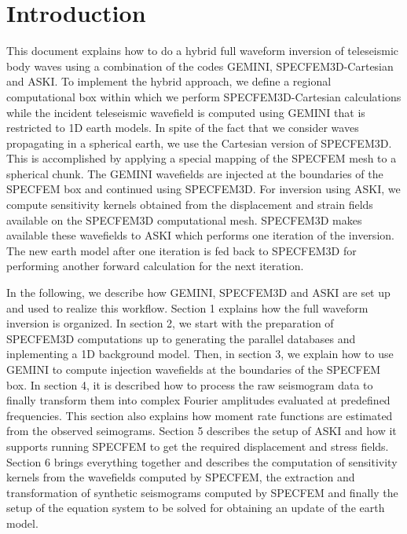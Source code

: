 %
\section*{Introduction}
%
 This document explains how to do a hybrid full waveform inversion of teleseismic body waves using a combination of the codes GEMINI, SPECFEM3D-Cartesian and ASKI. To implement the hybrid approach, we define a regional computational box within which we perform SPECFEM3D-Cartesian calculations while the incident teleseismic wavefield is computed using GEMINI that is restricted to 1D earth models. In spite of the fact that we consider waves propagating in a spherical earth, we use the Cartesian version of SPECFEM3D. This is accomplished by applying a special mapping of the SPECFEM mesh to a spherical chunk. The GEMINI wavefields are injected at the boundaries of the SPECFEM box and continued using SPECFEM3D. For inversion using ASKI, we compute sensitivity kernels obtained from the displacement and strain fields available on the SPECFEM3D computational mesh. SPECFEM3D makes available these wavefields to ASKI which performs one iteration of the inversion. The new earth model after one iteration is fed back to SPECFEM3D for performing another forward calculation for the next iteration.

 In the following, we describe how GEMINI, SPECFEM3D and ASKI are set up and used to realize this workflow. Section 1 explains how the full waveform inversion is organized. In section 2, we start with the preparation of SPECFEM3D computations up to generating the parallel databases and inplementing a 1D background model. Then, in section 3, we explain how to use GEMINI to compute injection wavefields at the boundaries of the SPECFEM box. In section 4, it is described how to process the raw seismogram data to finally transform them into complex Fourier amplitudes evaluated at predefined frequencies. This section also explains how moment rate functions are estimated from the observed seimograms. Section 5 describes the setup of ASKI and how it supports running SPECFEM to get the required displacement and stress fields. Section 6 brings everything together and describes the computation of sensitivity kernels from the wavefields computed by SPECFEM, the extraction and transformation of synthetic seismograms computed by SPECFEM and finally the setup of the equation system to be solved for obtaining an update of the earth model.
